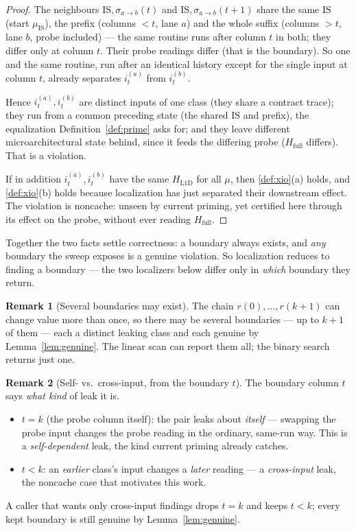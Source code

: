 \documentclass[11pt]{article}
\theoremstyle{definition}
\newtheorem{remark}{Remark}
\theoremstyle{plain}
\newcommand{\IS}{\mathrm{IS}}
\newcommand{\HL}{H_{\mathrm{L1D}}}
\newcommand{\HF}{H_{\mathrm{full}}}
\newcommand{\inp}[2]{i_{#1}^{(#2)}}
\begin{document}
\begin{proof}
The neighbours $\IS,\sigma_{a\to b}(t)$ and $\IS,\sigma_{a\to b}(t+1)$ share the same
$\IS$ (start $\mu_\IS$), the prefix (columns $<t$, lane $a$) and the whole suffix
(columns $>t$, lane $b$, probe included) --- the same routine runs after column $t$ in
both; they differ only at column $t$. Their probe readings differ (that is the
boundary). So one and the same routine, run after an identical history except for the
single input at column $t$, already separates $\inp{t}{a}$ from $\inp{t}{b}$.

Hence $\inp{t}{a},\inp{t}{b}$ are distinct inputs of one class (they share a contract
trace); they run from a common preceding state (the shared $\IS$ and prefix), the
equalization Definition~\ref{def:prime} asks for; and they leave different
microarchitectural state behind, since it feeds the differing probe ($\HF$ differs).
That is a violation.

If in addition $\inp{t}{a},\inp{t}{b}$ have the same $\HL$ for all $\mu$, then
\ref{def:xio}(a) holds, and \ref{def:xio}(b) holds because localization has just
separated their downstream effect. The violation is noncache: unseen by current priming,
yet certified here through its effect on the probe, without ever reading $\HF$.
\end{proof}

Together the two facts settle correctness: a boundary always exists, and \emph{any}
boundary the sweep exposes is a genuine violation. So localization reduces to finding a
boundary --- the two localizers below differ only in \emph{which} boundary they return.

\begin{remark}[Several boundaries may exist]
\label{rem:multiple}
The chain $r(0),\dots,r(k+1)$ can change value more than once, so there may be several
boundaries --- up to $k+1$ of them --- each a distinct leaking class and each genuine by
Lemma~\ref{lem:genuine}. The linear scan can report them all; the binary search returns
just one.
\end{remark}

\begin{remark}[Self- vs.\ cross-input, from the boundary $t$]
\label{rem:selfcross}
The boundary column $t$ says \emph{what kind} of leak it is.
\begin{itemize}[nosep,leftmargin=1.4em]
\item $t=k$ (the probe column itself): the pair leaks about \emph{itself} --- swapping
      the probe input changes the probe reading in the ordinary, same-run way. This is a
      \emph{self-dependent} leak, the kind current priming already catches.
\item $t<k$: an \emph{earlier} class's input changes a \emph{later} reading --- a
      \emph{cross-input} leak, the noncache case that motivates this work.
\end{itemize}
A caller that wants only cross-input findings drops $t=k$ and keeps $t<k$; every kept
boundary is still genuine by Lemma~\ref{lem:genuine}.
\end{remark}
\end{document}
